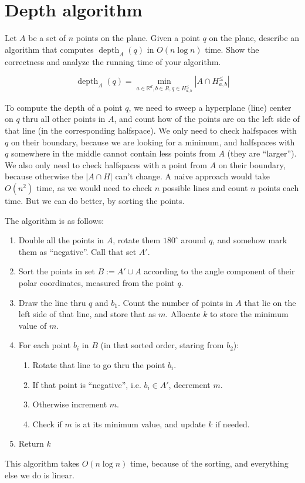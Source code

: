 \documentclass{article}
\newcommand{\R}{\mathbb{R}}
\newcommand{\Rd}{\R^d}
\begin{document}
  \section{Depth algorithm}
  \begin{centerframebox}
    Let $A$ be a set of $n$ points on the plane. Given a point $q$ on the plane, describe an algorithm
    that computes $\operatorname{depth}_A(q)$ in $O(n \log n)$ time.
    Show the correctness and analyze the running time of your algorithm.

    \[
      \operatorname{depth}_A(q) = \min_{a \in \Rd, b \in R, q \in H^\leq_{a,b}} |A \cap H^\leq_{a,b}|
    \]
  \end{centerframebox}
  To compute the depth of a point $q$, we need to sweep a hyperplane (line) center on $q$ thru all other points in $A$,
  and count how of the points are on the left side of that line (in the corresponding halfspace).
  We only need to check halfspaces with $q$ on their boundary, because we are looking for a minimum,
  and halfspaces with $q$ somewhere in the middle cannot contain less points from $A$ (they are ``larger'').
  We also only need to check halfspaces with a point from $A$ on their boundary, because otherwise the $|A \cap H|$ can't change.
  A naive approach would take $O(n^2)$ time, as we would need to check $n$ possible lines and count $n$ points each time.
  But we can do better, by sorting the points.

  The algorithm is as follows:
  \begin{enumerate}
    \item Double all the points in $A$, rotate them $180^\circ$ around $q$, and somehow mark them as ``negative''.
          Call that set $A'$.
    \item Sort the points in set $B := A' \cup A$ according to the angle component of their polar coordinates, measured from the point $q$.
    \item Draw the line thru $q$ and $b_1$.
          Count the number of points in $A$ that lie on the left side of that line, and store that as $m$.
          Allocate $k$ to store the minimum value of $m$.
    \item For each point $b_i$ in $B$ (in that sorted order, staring from $b_2$):
    \begin{enumerate}
      \item Rotate that line to go thru the point $b_i$.
      \item If that point is ``negative'', i.e. $b_i \in A'$, decrement $m$.
      \item Otherwise increment $m$.
      \item Check if $m$ is at its minimum value, and update $k$ if needed.
    \end{enumerate}
    \item Return $k$
  \end{enumerate}

  This algorithm takes $O(n \log n)$ time, because of the sorting, and everything else we do is linear.
\end{document}
